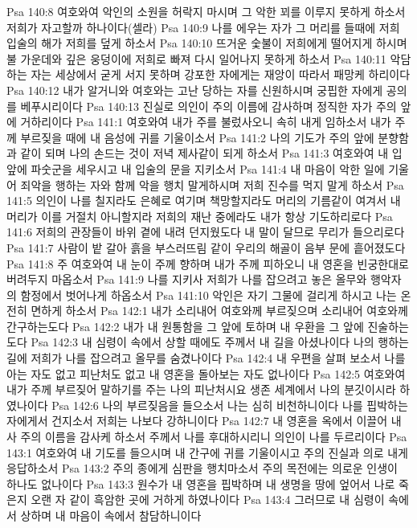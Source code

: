 Psa 140:8  여호와여 악인의 소원을 허락지 마시며 그 악한 꾀를 이루지 못하게 하소서 저희가 자고할까 하나이다(셀라)
Psa 140:9  나를 에우는 자가 그 머리를 들때에 저희 입술의 해가 저희를 덮게 하소서
Psa 140:10  뜨거운 숯불이 저희에게 떨어지게 하시며 불 가운데와 깊은 웅덩이에 저희로 빠져 다시 일어나지 못하게 하소서
Psa 140:11  악담하는 자는 세상에서 굳게 서지 못하며 강포한 자에게는 재앙이 따라서 패망케 하리이다
Psa 140:12  내가 알거니와 여호와는 고난 당하는 자를 신원하시며 궁핍한 자에게 공의를 베푸시리이다
Psa 140:13  진실로 의인이 주의 이름에 감사하며 정직한 자가 주의 앞에 거하리이다
Psa 141:1  여호와여 내가 주를 불렀사오니 속히 내게 임하소서 내가 주께 부르짖을 때에 내 음성에 귀를 기울이소서
Psa 141:2  나의 기도가 주의 앞에 분향함과 같이 되며 나의 손드는 것이 저녁 제사같이 되게 하소서
Psa 141:3  여호와여 내 입 앞에 파숫군을 세우시고 내 입술의 문을 지키소서
Psa 141:4  내 마음이 악한 일에 기울어 죄악을 행하는 자와 함께 악을 행치 말게하시며 저희 진수를 먹지 말게 하소서
Psa 141:5  의인이 나를 칠지라도 은혜로 여기며 책망할지라도 머리의 기름같이 여겨서 내 머리가 이를 거절치 아니할지라 저희의 재난 중에라도 내가 항상 기도하리로다
Psa 141:6  저희의 관장들이 바위 곁에 내려 던지웠도다 내 말이 달므로 무리가 들으리로다
Psa 141:7  사람이 밭 갈아 흙을 부스러뜨림 같이 우리의 해골이 음부 문에 흩어졌도다
Psa 141:8  주 여호와여 내 눈이 주께 향하며 내가 주께 피하오니 내 영혼을 빈궁한대로 버려두지 마옵소서
Psa 141:9  나를 지키사 저희가 나를 잡으려고 놓은 올무와 행악자의 함정에서 벗어나게 하옵소서
Psa 141:10  악인은 자기 그물에 걸리게 하시고 나는 온전히 면하게 하소서
Psa 142:1  내가 소리내어 여호와께 부르짖으며 소리내어 여호와께 간구하는도다
Psa 142:2  내가 내 원통함을 그 앞에 토하며 내 우환을 그 앞에 진술하는도다
Psa 142:3  내 심령이 속에서 상할 때에도 주께서 내 길을 아셨나이다 나의 행하는 길에 저희가 나를 잡으려고 올무를 숨겼나이다
Psa 142:4  내 우편을 살펴 보소서 나를 아는 자도 없고 피난처도 없고 내 영혼을 돌아보는 자도 없나이다
Psa 142:5  여호와여 내가 주께 부르짖어 말하기를 주는 나의 피난처시요 생존 세계에서 나의 분깃이시라 하였나이다
Psa 142:6  나의 부르짖음을 들으소서 나는 심히 비천하니이다 나를 핍박하는 자에게서 건지소서 저희는 나보다 강하니이다
Psa 142:7  내 영혼을 옥에서 이끌어 내사 주의 이름을 감사케 하소서 주께서 나를 후대하시리니 의인이 나를 두르리이다
Psa 143:1  여호와여 내 기도를 들으시며 내 간구에 귀를 기울이시고 주의 진실과 의로 내게 응답하소서
Psa 143:2  주의 종에게 심판을 행치마소서 주의 목전에는 의로운 인생이 하나도 없나이다
Psa 143:3  원수가 내 영혼을 핍박하며 내 생명을 땅에 엎어서 나로 죽은지 오랜 자 같이 흑암한 곳에 거하게 하였나이다
Psa 143:4  그러므로 내 심령이 속에서 상하며 내 마음이 속에서 참담하니이다

